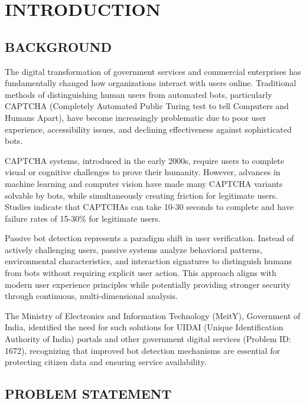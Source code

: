 
\chapter{INTRODUCTION}

\section{BACKGROUND}

The digital transformation of government services and commercial enterprises has fundamentally changed how organizations interact with users online. Traditional methods of distinguishing human users from automated bots, particularly CAPTCHA (Completely Automated Public Turing test to tell Computers and Humans Apart), have become increasingly problematic due to poor user experience, accessibility issues, and declining effectiveness against sophisticated bots.

CAPTCHA systems, introduced in the early 2000s, require users to complete visual or cognitive challenges to prove their humanity. However, advances in machine learning and computer vision have made many CAPTCHA variants solvable by bots, while simultaneously creating friction for legitimate users. Studies indicate that CAPTCHAs can take 10-30 seconds to complete and have failure rates of 15-30\% for legitimate users.

Passive bot detection represents a paradigm shift in user verification. Instead of actively challenging users, passive systems analyze behavioral patterns, environmental characteristics, and interaction signatures to distinguish humans from bots without requiring explicit user action. This approach aligns with modern user experience principles while potentially providing stronger security through continuous, multi-dimensional analysis.

The Ministry of Electronics and Information Technology (MeitY), Government of India, identified the need for such solutions for UIDAI (Unique Identification Authority of India) portals and other government digital services (Problem ID: 1672), recognizing that improved bot detection mechanisms are essential for protecting citizen data and ensuring service availability.

\section{PROBLEM STATEMENT}

